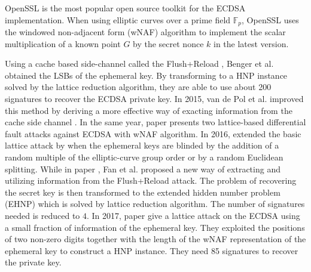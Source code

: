 OpenSSL\cite{openssl} is the most popular open source toolkit for the ECDSA implementation.
When using elliptic curves over a prime field $\mathbb{F}_{p}$,
 OpenSSL uses the windowed non-adjacent form (wNAF) algorithm \cite{GORDON1998129,Miyaji1997,Koyama1002,Solinas2000} to implement the scalar multiplication of a known point $G$ by the secret nonce $k$
  in the latest version.

Using a cache based side-channel called the Flush+Reload \cite{flushreload}, Benger et al. \cite{Benger2014} obtained the
LSBs of the ephemeral key. By transforming to a HNP instance solved by the lattice reduction algorithm, they are able to use about 200 signatures to recover the ECDSA private key.
In 2015, van de Pol et al. improved this method by deriving a more effective way of exacting information from the cache side channel \cite{Van2015}.
In the same year, paper \cite{Cao2015} presents two lattice-based differential fault attacks against ECDSA with wNAF algorithm.
In 2016, \cite{Dahmun2016}  extended the basic lattice attack by when the ephemeral keys are blinded by the addition of a random multiple of the elliptic-curve group order or by a random Euclidean splitting.
While in paper \cite{Fan2016}, Fan et al. proposed a new way of extracting and utilizing information from the Flush+Reload attack. The problem of recovering the
secret key is then transformed to the extended hidden number problem (EHNP) which is solved by lattice reduction algorithm. The number of signatures needed is reduced to $4$.
In 2017, paper \cite{Wang2017} give a lattice attack on the ECDSA using
 a small fraction of information of the ephemeral key.
They exploited the positions of two non-zero digits together with the length of the wNAF representation of the ephemeral key to construct a HNP instance. They need 85 signatures to recover the private key.



